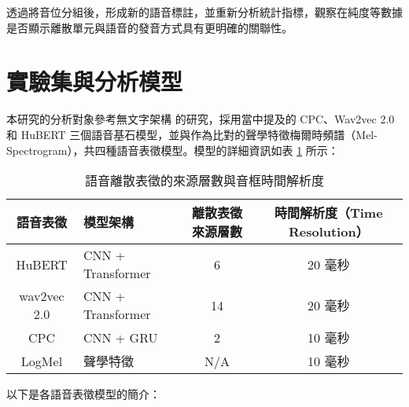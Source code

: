 透過將音位分組後，形成新的語音標註，並重新分析統計指標，觀察在純度等數據是否顯示離散單元與語音的發音方式具有更明確的關聯性。


\section{實驗集與分析模型}



本研究的分析對象參考無文字架構 \cite{noauthor_textless_2021, lakhotia_generative_2021, lakhotia_generative_2021-1} 的研究，採用當中提及的 CPC、Wav2vec 2.0 和 HuBERT 三個語音基石模型，並與作為比對的聲學特徵梅爾時頻譜（Mel-Spectrogram），共四種語音表徵模型。模型的詳細資訊如表 \ref{tab:model-info} 所示：

\begin{table}
    \centering
    \begin{tabular}{|c|l|c|c|} \hline 
         語音表徵&   模型架構&離散表徵來源層數& 時間解析度（Time Resolution）\\ \hline 
         HuBERT      &   CNN + Transformer&6& 20 毫秒\\ \hline 
         wav2vec 2.0 &   CNN + Transformer&14& 20 毫秒\\ \hline 
         CPC         &   CNN + GRU&2& 10 毫秒\\ \hline 
         LogMel      &   聲學特徵&N/A& 10 毫秒\\ \hline
    \end{tabular}
    \caption{語音離散表徵的來源層數與音框時間解析度}
    \label{tab:model-info}
\end{table}

以下是各語音表徵模型的簡介：

